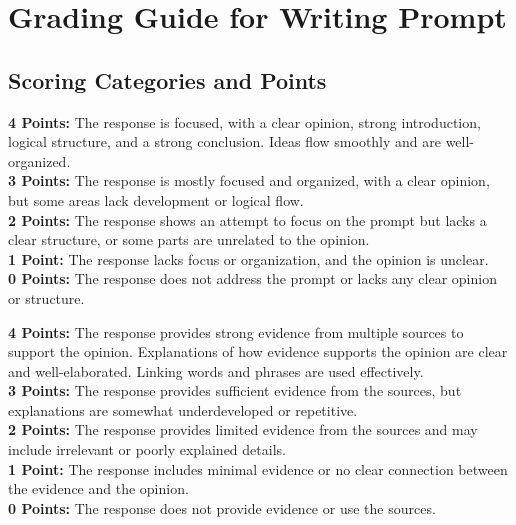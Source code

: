\documentclass[12pt]{article}
\begin{document}
\section*{Grading Guide for Writing Prompt}

\subsection*{Scoring Categories and Points}

\begin{tcolorbox}[colframe=black!40, colback=gray!5, title={Purpose, Focus, and Organization (0--4 points)}]
\textbf{4 Points:} The response is focused, with a clear opinion, strong introduction, logical structure, and a strong conclusion. Ideas flow smoothly and are well-organized. \\
\textbf{3 Points:} The response is mostly focused and organized, with a clear opinion, but some areas lack development or logical flow. \\
\textbf{2 Points:} The response shows an attempt to focus on the prompt but lacks a clear structure, or some parts are unrelated to the opinion. \\
\textbf{1 Point:} The response lacks focus or organization, and the opinion is unclear. \\
\textbf{0 Points:} The response does not address the prompt or lacks any clear opinion or structure.
\end{tcolorbox}

\begin{tcolorbox}[colframe=black!40, colback=gray!5, title=Evidence and Elaboration (0--4 points)]
\textbf{4 Points:} The response provides strong evidence from multiple sources to support the opinion. Explanations of how evidence supports the opinion are clear and well-elaborated. Linking words and phrases are used effectively. \\
\textbf{3 Points:} The response provides sufficient evidence from the sources, but explanations are somewhat underdeveloped or repetitive. \\
\textbf{2 Points:} The response provides limited evidence from the sources and may include irrelevant or poorly explained details. \\
\textbf{1 Point:} The response includes minimal evidence or no clear connection between the evidence and the opinion. \\
\textbf{0 Points:} The response does not provide evidence or use the sources.
\end{tcolorbox}
\end{document}
